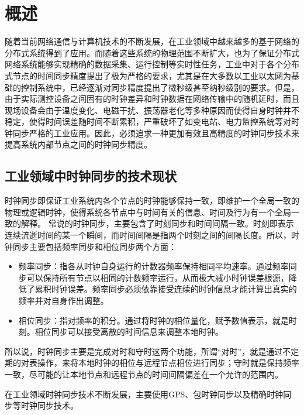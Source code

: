 
\chapter{概述}
\label{chap:intro}
随着当前网络通信与计算机技术的不断发展，在工业领域中越来越多的基于网络的分布式系统得到了应用。而随着这些系统的物理范围不断扩大，也为了保证分布式网络系统能够实现精确的数据采集、运行控制等实时性任务，工业中对于各个分布式节点的时间同步精度提出了极为严格的要求，尤其是在大多数以工业以太网为基础的控制系统中，已经逐渐对同步精度提出了微秒级甚至纳秒级别的要求。但是，由于实际测控设备之间固有的时钟差异和时钟数据在网络传输中的随机延时，而且现场设备会由于温度变化、电磁干扰、振荡器老化等多种原因而使得自身时钟并不稳定，使得时间误差随时间不断累积，严重破坏了如变电站、电力监控系统等对时钟同步严格的工业应用。因此，必须追求一种更加有效且高精度的时钟同步技术来提高系统内部节点之间的时钟同步精度。

\section{工业领域中时钟同步的技术现状}
时钟同步即保证工业系统内各个节点的时钟能够保持一致，即维护一个全局一致的物理或逻辑时钟，使得系统各节点中与时间有关的信息、时间及行为有一个全局一致的解释\supercite{1}。
常说的时钟同步，主要包含了时刻同步和时间间隔一致。时刻即表示连续流逝时间的某一个瞬间，而时间间隔是指两个时刻之间的间隔长度。所以，时钟同步主要包括频率同步和相位同步两个方面：
\begin{itemize}[noitemsep,topsep=0pt,parsep=0pt,partopsep=0pt]
	\item 频率同步：指各从时钟自身运行的计数器频率保持相同平均速率。通过频率同步可以保持所有节点以相同的计数频率运行，从而极大减小时钟误差根源，降低了累积时钟误差。频率同步必须依靠接受连续的时钟信息才能计算出真实的频率并对自身作出调整。
	\item 相位同步：指对频率的积分。通过将时钟的相位量化，赋予数值表示，就是时刻。相位同步可以接受离散的时间信息来调整本地时钟。
\end{itemize}
所以说，时钟同步主要是完成对时和守时这两个功能，所谓“对时”，就是通过不定期的对表操作，来将本地时钟的相位与远程节点相位进行同步；守时就是保持频率一致，尽可能的让本地节点和远程节点的时间间隔偏差在一个允许的范围内。

在工业领域时钟同步技术不断发展，主要使用GPS、包时钟同步以及精确时钟同步等时钟同步技术。

